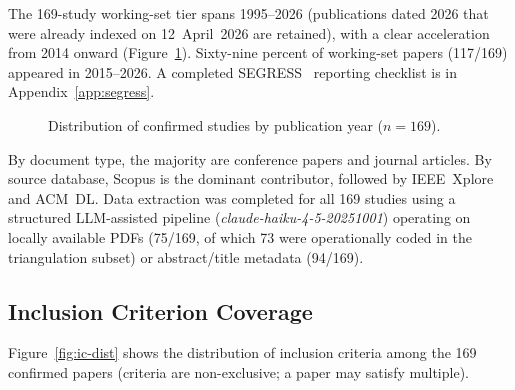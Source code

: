 The 169-study working-set tier spans 1995--2026 (publications dated 2026
that were already indexed on 12~April~2026 are retained), with a clear
acceleration from 2014 onward (Figure~\ref{fig:year-dist}). Sixty-nine
percent of working-set papers (117/169) appeared in 2015--2026.
A completed SEGRESS~\cite{kitchenham2023segress} reporting checklist is in
Appendix~\ref{app:segress}.

\begin{figure}[htbp]
\centering
{}
\caption{Distribution of confirmed studies by publication year ($n = 169$).}
\label{fig:year-dist}
\end{figure}

By document type, the majority are conference papers and journal articles.
By source database, Scopus is the dominant contributor, followed by
IEEE~Xplore and ACM~DL. Data extraction was completed for all 169 studies
using a structured LLM-assisted pipeline (\textit{claude-haiku-4-5-20251001})
operating on locally available PDFs (75/169, of which 73 were operationally
coded in the triangulation subset) or abstract/title metadata (94/169).

\subsection{Inclusion Criterion Coverage}

Figure~\ref{fig:ic-dist} shows the distribution of inclusion criteria among
the 169 confirmed papers (criteria are non-exclusive; a paper may satisfy
multiple).

